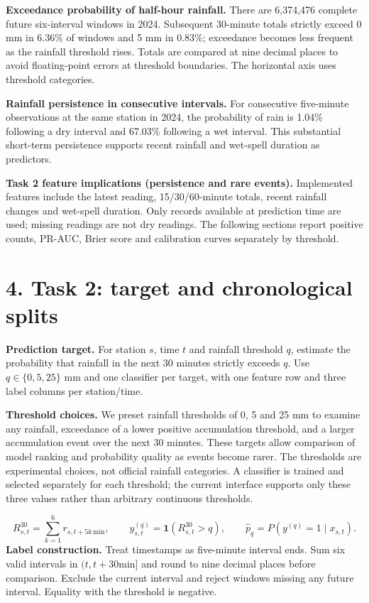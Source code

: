 \documentclass[UTF8,fontset=fandol,10pt,a4paper,landscape]{ctexart}
\begin{document}
\textbf{Exceedance probability of half-hour rainfall.} There are 6,374,476 complete future six-interval windows in 2024. Subsequent 30-minute totals strictly exceed 0 mm in 6.36\% of windows and 5 mm in 0.83\%; exceedance becomes less frequent as the rainfall threshold rises. Totals are compared at nine decimal places to avoid floating-point errors at threshold boundaries. The horizontal axis uses threshold categories.

\textbf{Rainfall persistence in consecutive intervals.} For consecutive five-minute observations at the same station in 2024, the probability of rain is 1.04\% following a dry interval and 67.03\% following a wet interval. This substantial short-term persistence supports recent rainfall and wet-spell duration as predictors.

\textbf{Task 2 feature implications (persistence and rare events).} Implemented features include the latest reading, 15/30/60-minute totals, recent rainfall changes and wet-spell duration. Only records available at prediction time are used; missing readings are not dry readings. The following sections report positive counts, PR-AUC, Brier score and calibration curves separately by threshold.
\clearpage\section*{4. Task 2: target and chronological splits}
\textbf{Prediction target.} For station $s$, time $t$ and rainfall threshold $q$, estimate the probability that rainfall in the next 30 minutes strictly exceeds $q$. Use $q\in\{0,5,25\}$ mm and one classifier per target, with one feature row and three label columns per station/time.

\textbf{Threshold choices.} We preset rainfall thresholds of 0, 5 and 25 mm to examine any rainfall, exceedance of a lower positive accumulation threshold, and a larger accumulation event over the next 30 minutes. These targets allow comparison of model ranking and probability quality as events become rarer. The thresholds are experimental choices, not official rainfall categories. A classifier is trained and selected separately for each threshold; the current interface supports only these three values rather than arbitrary continuous thresholds.

\[R_{s,t}^{30}=\sum_{k=1}^{6}r_{s,t+5k\,\mathrm{min}},\qquad y_{s,t}^{(q)}=\mathbf{1}(R_{s,t}^{30}>q),\qquad \hat p_q=P(y^{(q)}=1\mid x_{s,t}).\]
\textbf{Label construction.} Treat timestamps as five-minute interval ends. Sum six valid intervals in $(t,t+30\mathrm{min}]$ and round to nine decimal places before comparison. Exclude the current interval and reject windows missing any future interval. Equality with the threshold is negative.
\end{document}
